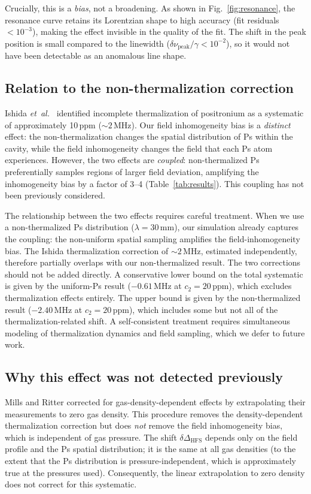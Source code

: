 \documentclass[twocolumn,pra,aps,superscriptaddress,floatfix,10pt]{revtex4-2}
\begin{document}
Crucially, this is a \emph{bias}, not a broadening. As shown in Fig.~\ref{fig:resonance}, the resonance curve retains its Lorentzian shape to high accuracy (fit residuals $< 10^{-3}$), making the effect invisible in the quality of the fit. The shift in the peak position is small compared to the linewidth ($\delta\nu_\mathrm{peak}/\gamma < 10^{-2}$), so it would not have been detectable as an anomalous line shape.

\subsection{Relation to the non-thermalization correction}

Ishida \textit{et~al.}~\cite{Ishida2014} identified incomplete thermalization of positronium as a systematic of approximately 10\,ppm ($\sim 2$\,MHz). Our field inhomogeneity bias is a \emph{distinct} effect: the non-thermalization changes the spatial distribution of Ps within the cavity, while the field inhomogeneity changes the field that each Ps atom experiences. However, the two effects are \emph{coupled}: non-thermalized Ps preferentially samples regions of larger field deviation, amplifying the inhomogeneity bias by a factor of 3--4 (Table~\ref{tab:results}). This coupling has not been previously considered.

The relationship between the two effects requires careful treatment. When we use a non-thermalized Ps distribution ($\lambda = 30$\,mm), our simulation already captures the coupling: the non-uniform spatial sampling amplifies the field-inhomogeneity bias. The Ishida thermalization correction of $\sim 2$\,MHz, estimated independently, therefore partially overlaps with our non-thermalized result. The two corrections should not be added directly. A conservative lower bound on the total systematic is given by the uniform-Ps result ($-0.61$\,MHz at $c_2 = 20$\,ppm), which excludes thermalization effects entirely. The upper bound is given by the non-thermalized result ($-2.40$\,MHz at $c_2 = 20$\,ppm), which includes some but not all of the thermalization-related shift. A self-consistent treatment requires simultaneous modeling of thermalization dynamics and field sampling, which we defer to future work.

\subsection{Why this effect was not detected previously}

Mills and Ritter corrected for gas-density-dependent effects by extrapolating their measurements to zero gas density. This procedure removes the density-dependent thermalization correction but does \emph{not} remove the field inhomogeneity bias, which is independent of gas pressure. The shift $\delta\Delta_\mathrm{HFS}$ depends only on the field profile and the Ps spatial distribution; it is the same at all gas densities (to the extent that the Ps distribution is pressure-independent, which is approximately true at the pressures used). Consequently, the linear extrapolation to zero density does not correct for this systematic.
\end{document}
